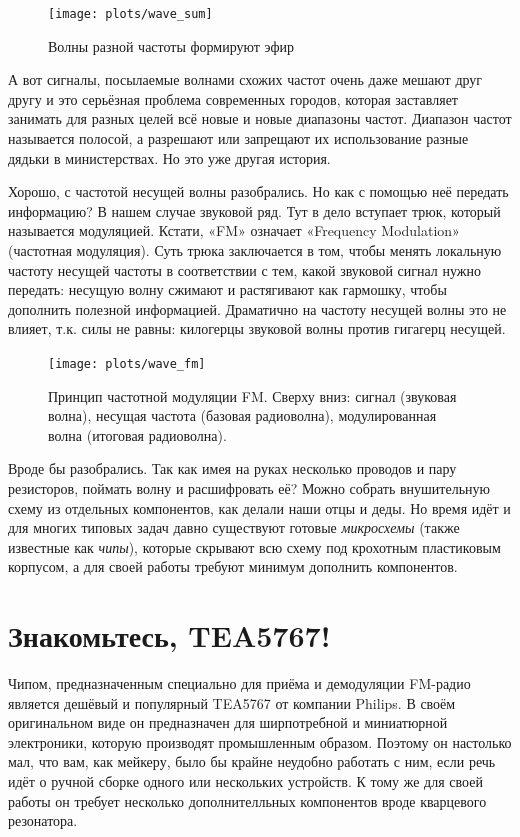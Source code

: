 \begin{figure}
  \centering
  \texttt{[image: plots/wave\_sum]}
  \caption{Волны разной частоты формируют эфир}
\end{figure}

\begin{Note}
  А вот сигналы, посылаемые волнами схожих частот очень даже мешают друг другу и это серьёзная проблема современных городов, которая заставляет занимать для разных целей всё новые и новые диапазоны частот. Диапазон частот называется полосой, а разрешают или запрещают их использование разные дядьки в министерствах. Но это уже другая история.
\end{Note}

Хорошо, с частотой несущей волны разобрались. Но как с помощью неё передать информацию? В нашем случае звуковой ряд. Тут в дело вступает трюк, который называется модуляцией. Кстати, «FM» означает «Frequency Modulation» (частотная модуляция). Суть трюка заключается в том, чтобы менять локальную частоту несущей частоты в соответствии с тем, какой звуковой сигнал нужно передать: несущую волну сжимают и растягивают как гармошку, чтобы дополнить полезной информацией. Драматично на частоту несущей волны это не влияет, т.к. силы не равны: килогерцы звуковой волны против гигагерц несущей.

\begin{figure}
  \centering
  \texttt{[image: plots/wave\_fm]}
  \caption{Принцип частотной модуляции FM. Сверху вниз: сигнал (звуковая волна), несущая частота (базовая радиоволна), модулированная волна (итоговая радиоволна).}
\end{figure}

Вроде бы разобрались. Так как имея на руках несколько проводов и пару резисторов, поймать волну и расшифровать её? Можно собрать внушительную схему из отдельных компонентов, как делали наши отцы и деды. Но время идёт и для многих типовых задач давно существуют готовые \emph{микросхемы} (также известные как \emph{чипы}), которые скрывают всю схему под крохотным пластиковым корпусом, а для своей работы требуют минимум дополнить компонентов.

\section{Знакомьтесь, TEA5767!}

Чипом, предназначенным специально для приёма и демодуляции FM-радио является дешёвый и популярный TEA5767 от компании Philips. В своём оригинальном виде он предназначен для ширпотребной и миниатюрной электроники, которую производят промышленным образом. Поэтому он настолько мал, что вам, как мейкеру, было бы крайне неудобно работать с ним, если речь идёт о ручной сборке одного или нескольких устройств. К тому же для своей работы он требует несколько дополнителльных компонентов вроде кварцевого резонатора.

